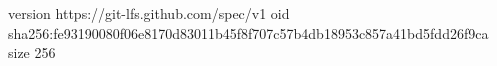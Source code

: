 version https://git-lfs.github.com/spec/v1
oid sha256:fe93190080f06e8170d83011b45f8f707c57b4db18953c857a41bd5fdd26f9ca
size 256
